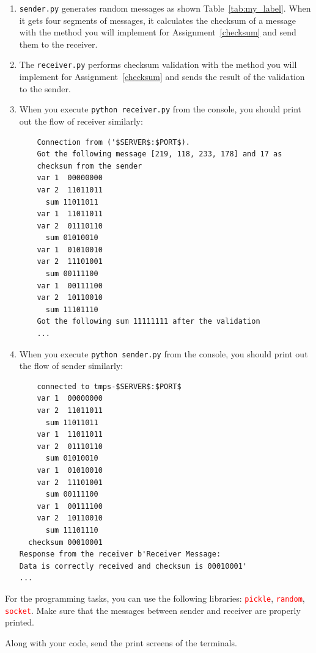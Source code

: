 \documentclass{resources/WeSTassignment}
\begin{document}
\begin{enumerate}
    \item \texttt{sender.py} generates random messages as shown Table~\ref{tab:my_label}. When it gets four segments of messages, it calculates the checksum of a message with the method you will implement for Assignment~\ref{checksum} and send them to the receiver.
    \item The \texttt{receiver.py} performs checksum validation with the method you will implement for Assignment~\ref{checksum} and sends the result of the validation to the sender. 
    \item When you execute \texttt{python receiver.py} from the console, you should print out the flow of receiver similarly:
    \begin{lstlisting}
    Connection from ('$SERVER$:$PORT$).
    Got the following message [219, 118, 233, 178] and 17 as
    checksum from the sender
    var 1  00000000
    var 2  11011011
      sum 11011011
    var 1  11011011
    var 2  01110110
      sum 01010010
    var 1  01010010
    var 2  11101001
      sum 00111100
    var 1  00111100
    var 2  10110010
      sum 11101110
    Got the following sum 11111111 after the validation
    ...
    \end{lstlisting}
    
    \item When you execute \texttt{python sender.py} from the console, you should print out the flow of sender similarly:
    
    \begin{lstlisting}
    connected to tmps-$SERVER$:$PORT$
    var 1  00000000
    var 2  11011011
      sum 11011011
    var 1  11011011
    var 2  01110110
      sum 01010010
    var 1  01010010
    var 2  11101001
      sum 00111100
    var 1  00111100
    var 2  10110010
      sum 11101110
  checksum 00010001
Response from the receiver b'Receiver Message: 
Data is correctly received and checksum is 00010001'
...
    \end{lstlisting}

\end{enumerate}


For the programming tasks, you can use the following libraries: \textcolor{red}{\texttt{pickle}}, \textcolor{red}{\texttt{random}}, \textcolor{red}{\texttt{socket}}. Make sure that the messages between sender and receiver are properly printed.

Along with your code, send the print screens of the terminals. 
\end{document}
